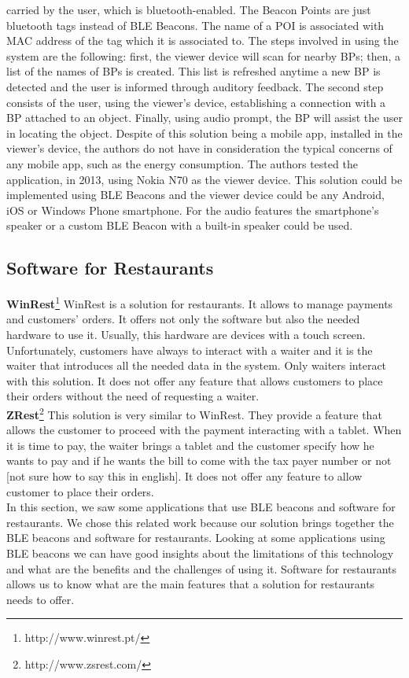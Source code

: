 carried by the user, which is bluetooth-enabled.
The Beacon Points are just bluetooth tags instead of
BLE Beacons. The name of a POI is associated with
MAC address of the tag which it is associated to.
The steps involved in using the system are the
following: first, the viewer device will scan
for nearby BPs; then, a list of the names of
BPs is created. This list is refreshed anytime a new
BP is detected and the user is informed through auditory
feedback. The second step consists of the user, using
the viewer's device, establishing a connection with a BP
attached to an object. Finally, using audio prompt, the BP
will assist the user in locating the object.
Despite of this solution being a mobile app, installed
in the viewer's device, the authors do not have in
consideration the typical concerns of any mobile app,
such as the energy consumption.
The authors tested the application, in 2013,
using Nokia N70 as the viewer device.
This solution could be implemented using BLE Beacons
and the viewer device could be any Android, iOS or
Windows Phone smartphone.
For the audio features the smartphone's speaker or
a custom BLE Beacon with a built-in speaker could be
used.

\subsection{Software for Restaurants}
\label{subs:software_for_restaurants}
\textbf{WinRest}\footnote{http://www.winrest.pt/}
WinRest is a solution for restaurants. It allows to manage payments
and customers' orders. It offers not only the software but also the
needed hardware to use it. Usually, this hardware are devices with
a touch screen. Unfortunately, customers have always to interact
with a waiter and it is the waiter that introduces all the needed data
in the system. Only waiters interact with this solution. It does not
offer any feature that allows customers to place their orders
without the need of requesting a waiter.
\\
\textbf{ZRest}\footnote{http://www.zsrest.com/}
This solution is very similar to WinRest.
They provide a feature that allows the
customer to proceed with the payment interacting with a tablet.
When it is time to pay, the waiter brings a tablet and the customer
specify how he wants to pay and if he wants the bill to come with
the tax payer number or not [not sure how to say this in english].
It does not offer any feature to allow customer to place their orders.
\\

In this section, we saw some applications that use BLE beacons and software
for restaurants. We chose this related work because our solution
brings together the BLE beacons and software for restaurants.
Looking at some applications using BLE beacons we can have good insights
about the limitations of this technology and what are the benefits and
the challenges of using it.
Software for restaurants allows us to know what are the main features
that a solution for restaurants needs to offer.
